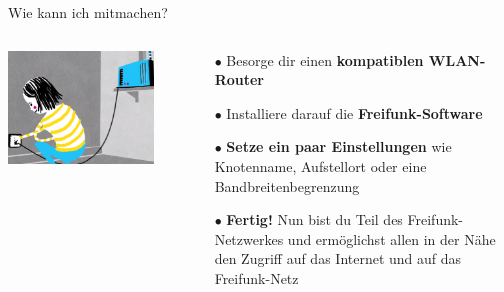 \documentclass[10pt]{beamer}
\begin{document}
  \begin{frame}{Wie kann ich mitmachen?}
    \begin{columns}[T]
     \begin{column}{5cm}
	\vspace{1em}
        \includegraphics[width=0.9\textwidth]{images/setup}
      \end{column}
      \begin{column}{5cm}
        \begin{itemize}
          \item[\textcolor{freifunkpink}{\Large$\bullet$}] Besorge dir einen \textbf{kompatiblen WLAN-Router}
          \item[\textcolor{freifunkpink}{\Large$\bullet$}] Installiere darauf die \textbf{Freifunk-Software}
          \item[\textcolor{freifunkpink}{\Large$\bullet$}] \textbf{Setze ein paar Einstellungen} wie Knotenname, Aufstellort oder eine Bandbreitenbegrenzung
          \item[\textcolor{freifunkpink}{\Large$\bullet$}] \textbf{Fertig!} Nun bist du Teil des Freifunk-Netzwerkes und ermöglichst allen in der Nähe den Zugriff auf das Internet und auf das Freifunk-Netz
        \end{itemize}
      \end{column}
    \end{columns}
  \end{frame}
\end{document}

